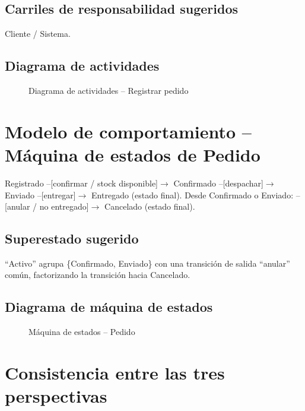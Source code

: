 \documentclass[11pt,a4paper]{article}
\begin{document}
\subsection*{Carriles de responsabilidad sugeridos}
Cliente / Sistema.

\subsection*{Diagrama de actividades}
\begin{figure}[h!]
    \centering
    \resizebox{0.6\textwidth}{!}{}
    \caption{Diagrama de actividades -- Registrar pedido}
    \label{fig:activity}
\end{figure}

\newpage

\section{Modelo de comportamiento -- Máquina de estados de Pedido}

Registrado --[confirmar / stock disponible]$\rightarrow$ Confirmado --[despachar]$\rightarrow$ Enviado --[entregar]$\rightarrow$ Entregado (estado final).
Desde Confirmado o Enviado: --[anular / no entregado]$\rightarrow$ Cancelado (estado final).

\subsection*{Superestado sugerido}
``Activo'' agrupa \{Confirmado, Enviado\} con una transición de salida ``anular'' común,
factorizando la transición hacia Cancelado.

\subsection*{Diagrama de máquina de estados}
\begin{figure}[h!]
    \centering
    \resizebox{\textwidth}{!}{}
    \caption{Máquina de estados -- Pedido}
    \label{fig:state}
\end{figure}

\newpage

\section{Consistencia entre las tres perspectivas}
\end{document}
